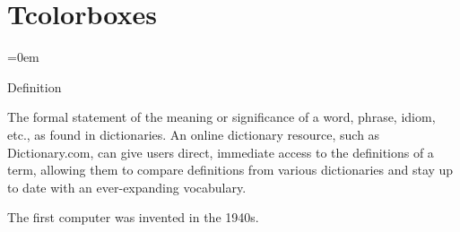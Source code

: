 
\section{Tcolorboxes}
\label{sec:tcolorboxes}

\parindent=0em

\tcolorboxdefinition
{Definition}
{\label{def:definition}}
{

The formal statement of the meaning or significance of a word, phrase, idiom, etc., as found in dictionaries. An online dictionary resource, such as Dictionary.com, can give users direct, immediate access to the definitions of a term, allowing them to compare definitions from various dictionaries and stay up to date with an ever-expanding vocabulary.


}


\lipsum[1]



\tcolorboxnote
{

The first computer was invented in the 1940s.

}



\lipsum[1]


\sectionend

